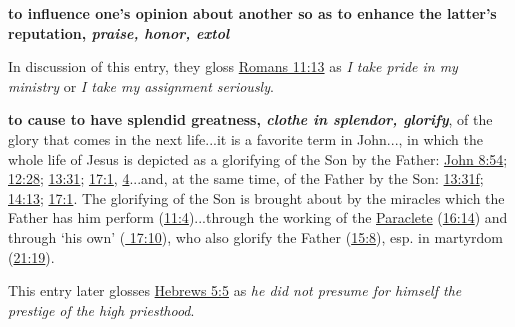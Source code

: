 				\begin{compactdesc}
					\item[BDAG 228b] \textbf{}
						\begin{compactitem}
							\item[1] \textbf{to influence one's opinion about another so as to enhance the latter's reputation, \textit{praise, honor, extol}}
								\begin{compactitem}
									\item In discussion of this entry, they gloss \hyperref[ROMANS-11-13]{Romans 11:13} as \textit{I take pride in my ministry} or \textit{I take my assignment seriously}.
								\end{compactitem}
							\item[2] \textbf{to cause to have splendid greatness, \textit{clothe in splendor, glorify}}, of the glory that comes in the next life...it is a favorite term in John..., in which the whole life of Jesus is depicted as a glorifying of the Son by the Father: \hyperref[JOHN-8-54]{John 8:54}; \hyperref[JOHN-12-18]{12:28}; \hyperref[JOHN-13-31]{13:31}; \hyperref[JOHN-17-1]{17:1}, \hyperref[JOHN-17-4]{4}...and, at the same time, of the Father by the Son: \hyperref[JOHN-13-31]{13:31f}; \hyperref[JOHN-14-13]{14:13}; \hyperref[JOHN-17-1]{17:1}. The glorifying of the Son is brought about by the miracles which the Father has him perform (\hyperref[JOHN-11-4]{11:4})...through the working of the \hyperref[PARAKLETOS]{Paraclete} (\hyperref[JOHN-16-14]{16:14}) and through `his own' (\hyperref[JOHN-17-10]{ 17:10}), who also glorify the Father (\hyperref[JOHN-15-8]{15:8}), esp. in martyrdom (\hyperref[JOHN-21-19]{21:19}).
								\begin{compactitem}
									\item This entry later glosses \hyperref[HEBREWS-5-5]{Hebrews 5:5} as \textit{he did not presume for himself the prestige of the high priesthood}.
								\end{compactitem}
						\end{compactitem}
				\end{compactdesc}
				
